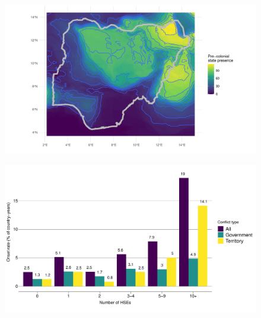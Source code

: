 \documentclass{beamer}
\begin{document}
\begin{frame} %
	\begin{figure}
		\includegraphics[width=\linewidth]{../R/Output/nigeria.pdf}
	\end{figure}
\end{frame}


\begin{frame}
\end{frame}


\begin{frame} %
	\begin{figure}
		\includegraphics[width=\linewidth]{img/hse_onset_rates.pdf}
	\end{figure}
\end{frame}


\begin{frame}
\end{frame}
\end{document}
